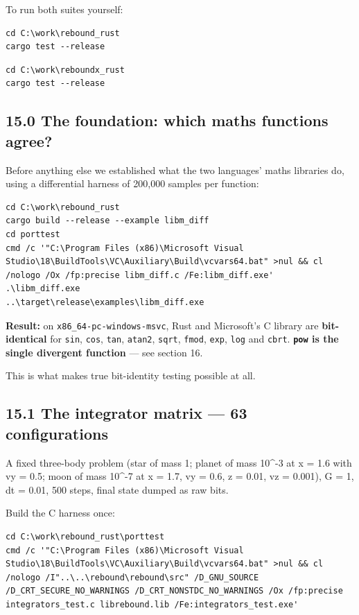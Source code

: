 \documentclass[11pt]{article}
\begin{document}
To run both suites yourself:

\begin{lstlisting}
cd C:\work\rebound_rust
cargo test --release
\end{lstlisting}

\begin{lstlisting}
cd C:\work\reboundx_rust
cargo test --release
\end{lstlisting}

\subsection{15.0 The foundation: which maths functions agree?}

Before anything else we established what the two languages' maths libraries do, using a differential harness of 200,000 samples per function:

\begin{lstlisting}
cd C:\work\rebound_rust
cargo build --release --example libm_diff
cd porttest
cmd /c '"C:\Program Files (x86)\Microsoft Visual Studio\18\BuildTools\VC\Auxiliary\Build\vcvars64.bat" >nul && cl /nologo /Ox /fp:precise libm_diff.c /Fe:libm_diff.exe'
.\libm_diff.exe
..\target\release\examples\libm_diff.exe
\end{lstlisting}

\textbf{Result:} on \texttt{x86\_64-pc-windows-msvc}, Rust and Microsoft's C library are \textbf{bit-identical} for \texttt{sin}, \texttt{cos}, \texttt{tan}, \texttt{atan2}, \texttt{sqrt}, \texttt{fmod}, \texttt{exp}, \texttt{log} and \texttt{cbrt}. \textbf{\texttt{pow} is the single divergent function} --- see section 16.

This is what makes true bit-identity testing possible at all.

\subsection{15.1 The integrator matrix --- 63 configurations}

A fixed three-body problem (star of mass 1; planet of mass 10\textasciicircum{}-3 at x = 1.6 with vy = 0.5; moon of mass 10\textasciicircum{}-7 at x = 1.7, vy = 0.6, z = 0.01, vz = 0.001), G = 1, dt = 0.01, 500 steps, final state dumped as raw bits.

Build the C harness once:

\begin{lstlisting}
cd C:\work\rebound_rust\porttest
cmd /c '"C:\Program Files (x86)\Microsoft Visual Studio\18\BuildTools\VC\Auxiliary\Build\vcvars64.bat" >nul && cl /nologo /I"..\..\rebound\rebound\src" /D_GNU_SOURCE /D_CRT_SECURE_NO_WARNINGS /D_CRT_NONSTDC_NO_WARNINGS /Ox /fp:precise integrators_test.c librebound.lib /Fe:integrators_test.exe'
\end{lstlisting}
\end{document}
